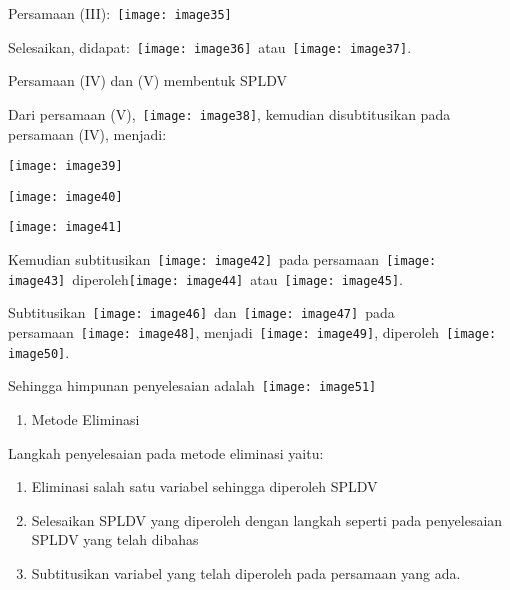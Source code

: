 \documentclass[11pt,fleqn]{book} %
\begin{document}
\noindent Persamaan (III):~\texttt{[image: image35]}

\noindent Selesaikan, didapat:~\texttt{[image: image36]}~atau~\texttt{[image: image37]}.

\noindent Persamaan (IV) dan (V) membentuk SPLDV

\noindent Dari persamaan (V),~\texttt{[image: image38]}, kemudian disubtitusikan pada persamaan (IV), menjadi:

\noindent \texttt{[image: image39]}

\noindent \texttt{[image: image40]}

\noindent \texttt{[image: image41]}

\noindent Kemudian subtitusikan~\texttt{[image: image42]}~pada persamaan~\texttt{[image: image43]}~diperoleh\texttt{[image: image44]}~atau~\texttt{[image: image45]}.

\noindent Subtitusikan~\texttt{[image: image46]}~dan~\texttt{[image: image47]}~pada persamaan~\texttt{[image: image48]}, menjadi~\texttt{[image: image49]}, diperoleh~\texttt{[image: image50]}.

\noindent Sehingga himpunan penyelesaian adalah~\texttt{[image: image51]}

\begin{enumerate}
\item  Metode Eliminasi
\end{enumerate}

\noindent Langkah penyelesaian pada metode eliminasi yaitu:

\begin{enumerate}
\item  Eliminasi salah satu variabel sehingga diperoleh SPLDV

\item  Selesaikan SPLDV yang diperoleh dengan langkah seperti pada penyelesaian SPLDV yang telah dibahas

\item  Subtitusikan variabel yang telah diperoleh pada persamaan yang ada.
\end{enumerate}
\end{document}
